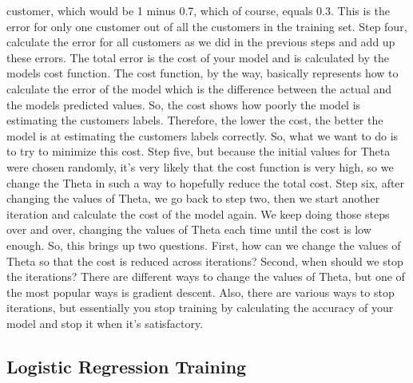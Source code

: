 customer, which would be 1 minus 0.7, which of course, equals 0.3. This is the error for only one customer out of all the customers in the training set. Step four, calculate the error for all customers as we did in the previous steps and add up these errors. The total error is the cost of your model and is calculated by the models cost function. The cost function, by the way, basically represents how to calculate the error of the model which is the difference between the actual and the models predicted values. So, the cost shows how poorly the model is estimating the customers labels. Therefore, the lower the cost, the better the model is at estimating the customers labels correctly. So, what we want to do is to try to minimize this cost. Step five, but because the initial values for Theta were chosen randomly, it's very likely that the cost function is very high, so we change the Theta in such a way to hopefully reduce the total cost. Step six, after changing the values of Theta, we go back to step two, then we start another iteration and calculate the cost of the model again. We keep doing those steps over and over, changing the values of Theta each time until the cost is low enough. So, this brings up two questions. First, how can we change the values of Theta so that the cost is reduced across iterations? Second, when should we stop the iterations? There are different ways to change the values of Theta, but one of the most popular ways is gradient descent. Also, there are various ways to stop iterations, but essentially you stop training by calculating the accuracy of your model and stop it when it's satisfactory. 
	
	\subsection{Logistic Regression Training}
	
